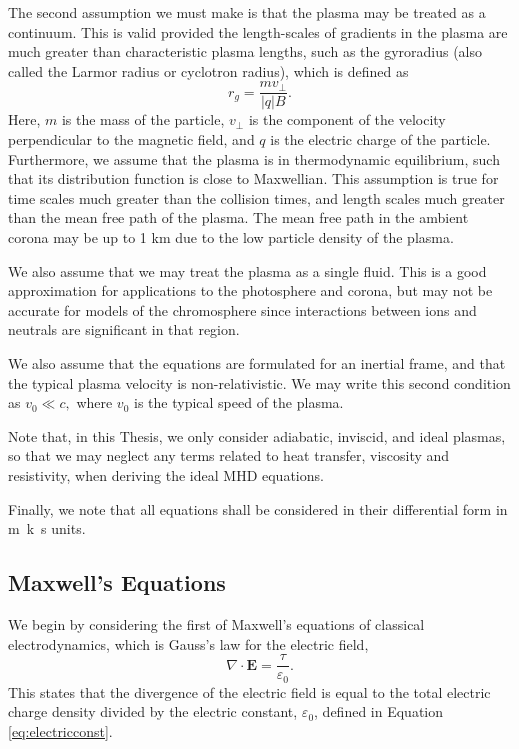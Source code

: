 The second assumption we must make is that the plasma may be treated as a continuum.
This is valid provided the length-scales of gradients in the plasma are much greater than characteristic plasma lengths, such as the gyroradius (also called the Larmor radius or cyclotron radius), which is defined as
\[
r_g = \frac{m v_\perp}{|q| B}.
\]
Here, $m$ is the mass of the particle, $v_\perp$ is the component of the velocity perpendicular to the magnetic field, and $q$ is the electric charge of the particle.
Furthermore, we assume that the plasma is in thermodynamic equilibrium, such that its distribution function is close to Maxwellian.
This assumption is true for time scales much greater than the collision times, and length scales much greater than the mean free path of the plasma.
The mean free path in the ambient corona may be up to 1 \si{km} due to the low particle density of the plasma.

We also assume that we may treat the plasma as a single fluid.
This is a good approximation for applications to the photosphere and corona, but may not be accurate for models of the chromosphere since interactions between ions and neutrals are significant in that region.

We also assume that the equations are formulated for an inertial frame, and that the typical plasma velocity is non-relativistic.
We may write this second condition as
$
v_0 \ll c,
$
where $v_0$ is the typical speed of the plasma.

Note that, in this Thesis, we only consider adiabatic, inviscid, and ideal plasmas, so that we may neglect any terms related to heat transfer, viscosity and resistivity, when deriving the ideal MHD equations.

Finally, we note that all equations shall be considered in their differential form in \si{m.k.s} units.

\subsection{Maxwell's Equations}
\label{subsec:Max}

We begin by considering the first of Maxwell's equations of classical electrodynamics, which is Gauss's law for the electric field,
%
\begin{equation}
\label{eq:max1}
\nabla \cdot \mathbf E = \dfrac{\tau}{\varepsilon_0}.
\end{equation}
%
This states that the divergence of the electric field is equal to the total electric charge density divided by the electric constant, $\varepsilon_0$, defined in Equation \eqref{eq:electricconst}.

